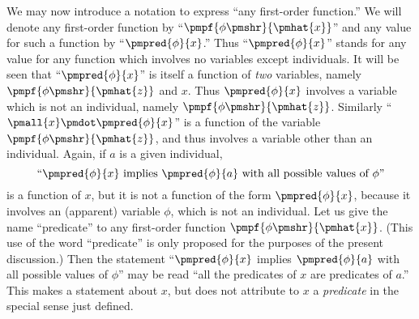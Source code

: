 \documentclass[letterpaper,12pt,openany,leqno]{book}
\begin{document}
We may now introduce a notation to express ``any first-order function.'' We will denote any first-order function by ``$\pmpf{\phi\pmshr}{\pmhat{x}}$'' and any value for such a function by ``$\pmpred{\phi}{x}$.'' Thus ``$\pmpred{\phi}{x}$'' stands for any value for any function which involves no variables except individuals. It will be seen that ``$\pmpred{\phi}{x}$'' is itself a function of \textit{two} variables, namely $\pmpf{\phi\pmshr}{\pmhat{z}}$ and $x$. Thus $\pmpred{\phi}{x}$ involves a variable which is not an individual, namely $\pmpf{\phi\pmshr}{\pmhat{z}}$. Similarly ``$\pmall{x}\pmdot \pmpred{\phi}{x}$'' is a function of the variable $\pmpf{\phi\pmshr}{\pmhat{z}}$, and thus involves a variable other than an individual. Again, if $a$ is a given individual,
\[
	\text{``}\pmpred{\phi}{x} \text{ implies } \pmpred{\phi}{a} \text{ with all possible values of } \phi\text{''}
\]
is a function of $x$, but it is not a function of the form $\pmpred{\phi}{x}$, because it involves an (apparent) variable $\phi$, which is not an individual. Let us give the name ``predicate'' to any first-order function $\pmpf{\phi\pmshr}{\pmhat{x}}$. (This use of the word ``predicate'' is only proposed for the purposes of the present discussion.) Then the statement ``$\pmpred{\phi}{x}$ implies $\pmpred{\phi}{a}$ with all possible values of $\phi$'' may be read ``all the predicates of $x$ are predicates of $a$.'' This makes a statement about $x$, but does not attribute to $x$ a \textit{predicate} in the special sense just defined.
\end{document}
